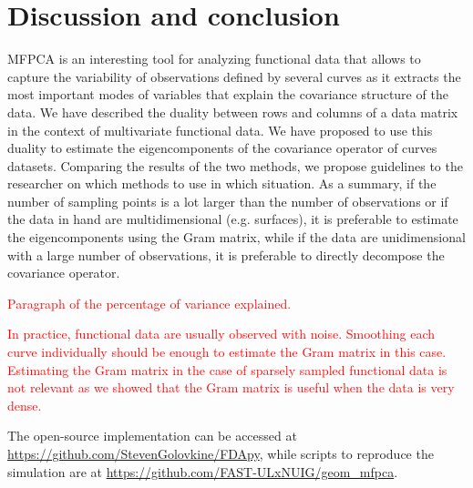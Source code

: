 \section{Discussion and conclusion} %
\label{sec:discussion}

MFPCA is an interesting tool for analyzing functional data that allows to capture the variability of observations defined by several curves as it extracts the most important modes of variables that explain the covariance structure of the data. We have described the duality between rows and columns of a data matrix in the context of multivariate functional data. We have proposed to use this duality to estimate the eigencomponents of the covariance operator of curves datasets. Comparing the results of the two methods, we propose guidelines to the researcher on which methods to use in which situation. As a summary, if the number of sampling points is a lot larger than the number of observations or if the data in hand are multidimensional (e.g. surfaces), it is preferable to estimate the eigencomponents using the Gram matrix, while if the data are unidimensional with a large number of observations, it is preferable to directly decompose the covariance operator.

\textcolor{red}{Paragraph of the percentage of variance explained.}

\textcolor{red}{In practice, functional data are usually observed with noise. Smoothing each curve individually should be enough to estimate the Gram matrix in this case. Estimating the Gram matrix in the case of sparsely sampled functional data is not relevant as we showed that the Gram matrix is useful when the data is very dense.}

The open-source implementation can be accessed at \url{https://github.com/StevenGolovkine/FDApy}, while scripts to reproduce the simulation are at \url{https://github.com/FAST-ULxNUIG/geom_mfpca}.


